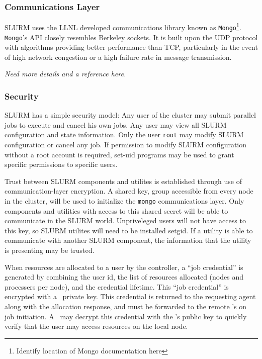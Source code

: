 \subsubsection{Communications Layer}

SLURM uses the LLNL developed communications library known as 
{\tt Mongo}\footnote{Identify location of Mongo documentation here}. 
{\tt Mongo}'s API closely resembles Berkeley sockets. It is built upon the UDP 
protocol with algorithms providing better performance than TCP, particularly 
in the event of high network congestion or a high failure rate in message 
transmission. 

{\em Need more details and a reference here.}

\subsubsection{Security}

SLURM has a simple security model: 
Any user of the cluster may submit parallel jobs to execute and cancel
his own jobs.  Any user may view all SLURM configuration and state
information.  Only the user {\tt root} may modify SLURM configuration or
cancel any job.  If permission to modify SLURM configuration without a
root account is required, set-uid programs may be used to grant specific
permissions to specific users.

Trust between SLURM components and utilites is established through use
of communication-layer encryption. A shared key, group accessible from
every node in the cluster, will be used to initialize the {\tt mongo}
communications layer. Only components and utilities with access to this
shared secret will be able to communicate in the SLURM world. Unpriveleged
users will not have access to this key, so SLURM utilites will need to be
installed setgid. If a utility is able to communicate with another SLURM
component, the information that the utility is presenting may be trusted.

When resources are allocated to a user by the controller, a ``job 
credential'' is generated by combining the user id, the list of
resources allocated (nodes and processers per node), and the credential
lifetime. This ``job credential'' is encrypted with a \slurmctld\ private key. 
This credential is returned to the requesting agent along with the
allocation response, and must be forwarded to the remote \slurmd 's 
on job initiation. A \slurmd\ may decrypt this credential with the
\slurmctld 's public key to quickly verify that the user may access
resources on the local node. 

